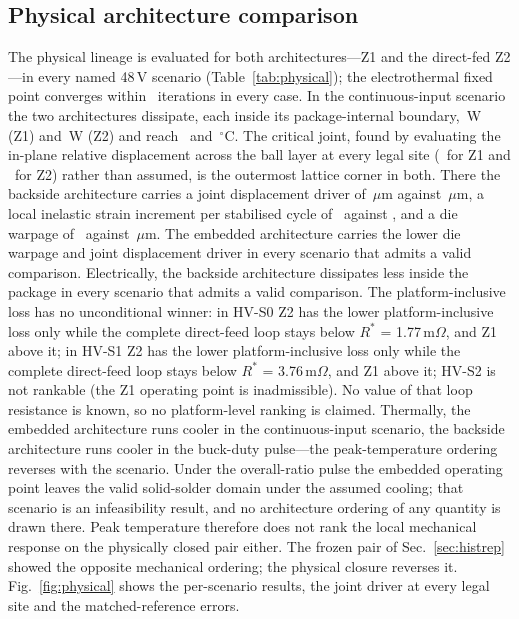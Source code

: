 \documentclass[journal]{IEEEtran}
\begin{document}
\subsection{Physical architecture comparison}\label{sec:physical}
The physical lineage is evaluated for both architectures---Z1 and the direct-fed Z2---in every named 48\,V scenario
(Table~\ref{tab:physical}); the electrothermal fixed point converges within \EtIters\
iterations in every case. In the continuous-input scenario the two architectures dissipate, each inside its package-internal boundary,
\PlossZone\,W (Z1) and \PlossZtwo\,W (Z2) and reach \TmaxZone\ and \TmaxZtwo\,$^\circ$C. The
critical joint, found by evaluating the in-plane relative displacement across the ball layer
at every legal site (\NjointZone\ for Z1 and \NjointZtwo\ for Z2) rather than assumed, is the
outermost lattice corner in both. There the backside architecture carries a joint
displacement driver of \DuZtwo\,$\mu$m against \DuZone\,$\mu$m, a local inelastic strain
increment per stabilised cycle of \EpsZtwo\ against \EpsZone, and a die warpage of
\WarpZtwo\ against \WarpZone\,$\mu$m. The embedded architecture carries the lower die warpage and joint displacement driver in every scenario that admits a valid comparison. Electrically, the backside architecture dissipates less inside the package in every scenario that admits a valid comparison. The platform-inclusive loss has no unconditional winner: in HV-S0 Z2 has the lower platform-inclusive loss only while the complete direct-feed loop stays below $R^{*}$ = 1.77\,m$\Omega$, and Z1 above it; in HV-S1 Z2 has the lower platform-inclusive loss only while the complete direct-feed loop stays below $R^{*}$ = 3.76\,m$\Omega$, and Z1 above it; HV-S2 is not rankable (the Z1 operating point is inadmissible). No value of that loop resistance is known, so no platform-level ranking is claimed.
Thermally, the embedded architecture runs cooler in the continuous-input scenario, the backside architecture runs cooler in the buck-duty pulse---the peak-temperature ordering reverses with the scenario. Under the overall-ratio pulse the embedded operating point leaves the valid solid-solder domain under the assumed cooling; that scenario is an infeasibility result, and no architecture ordering of any quantity is drawn there. Peak temperature therefore does not rank the local mechanical response on
the physically closed pair either. The frozen pair of Sec.~\ref{sec:histrep} showed the opposite mechanical ordering; the physical closure reverses it. Fig.~\ref{fig:physical} shows the per-scenario
results, the joint driver at every legal site and the matched-reference errors.
\end{document}

